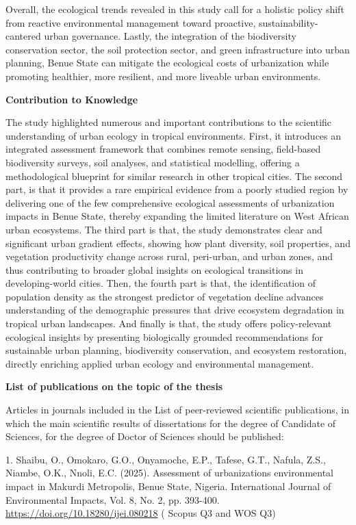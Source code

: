 Overall, the ecological trends revealed in this study call for a holistic policy shift from reactive environmental management toward proactive, sustainability-cantered urban governance. Lastly, the integration of the biodiversity conservation sector, the soil protection sector, and green infrastructure into urban planning, Benue State can mitigate the ecological costs of urbanization while promoting healthier, more resilient, and more liveable urban environments.

{}\textbf{Contribution to Knowledge}

The study highlighted numerous and important contributions to the scientific understanding of urban ecology in tropical environments. First, it introduces an integrated assessment framework that combines remote sensing, field-based biodiversity surveys, soil analyses, and statistical modelling, offering a methodological blueprint for similar research in other tropical cities. The second part, is that it provides a rare empirical evidence from a poorly studied region by delivering one of the few comprehensive ecological assessments of urbanization impacts in Benue State, thereby expanding the limited literature on West African urban ecosystems. The third part is that, the study demonstrates clear and significant urban gradient effects, showing how plant diversity, soil properties, and vegetation productivity change across rural, peri-urban, and urban zones, and thus contributing to broader global insights on ecological transitions in developing-world cities. Then, the fourth part is that, the identification of population density as the strongest predictor of vegetation decline advances understanding of the demographic pressures that drive ecosystem degradation in tropical urban landscapes. And finally is that, the study offers policy-relevant ecological insights by presenting biologically grounded recommendations for sustainable urban planning, biodiversity conservation, and ecosystem restoration, directly enriching applied urban ecology and environmental management.

{}\textbf{List of publications on the topic of the thesis}

Articles in journals included in the List of peer-reviewed scientific publications, in which the main scientific results of dissertations for the degree of Candidate of Sciences, for the degree of Doctor of Sciences should be published:

1. Shaibu, O., Omokaro, G.O., Onyamoche, E.P., Tafese, G.T., Nafula, Z.S., Niambe, O.K., Nnoli, E.C. (2025). Assessment of urbanization\textquotesingle s environmental impact in Makurdi Metropolis, Benue State, Nigeria. International Journal of Environmental Impacts, Vol. 8, No. 2, pp. 393-400. \url{https://doi.org/10.18280/ijei.080218} ( Scopus Q3 and WOS Q3)

